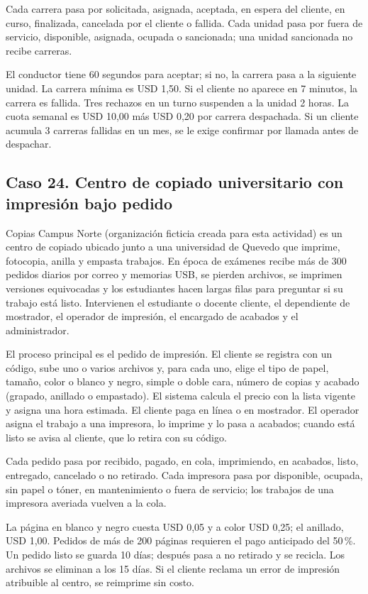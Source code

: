 \documentclass[11pt]{article}
\newcommand{\subseccion}[1]{\subsection{\textcolor{midblue}{#1}}}
\begin{document}
Cada carrera pasa por solicitada, asignada, aceptada, en espera del cliente, en curso, finalizada, cancelada por el cliente o fallida. Cada unidad pasa por fuera de servicio, disponible, asignada, ocupada o sancionada; una unidad sancionada no recibe carreras.

El conductor tiene 60 segundos para aceptar; si no, la carrera pasa a la siguiente unidad. La carrera mínima es USD 1,50. Si el cliente no aparece en 7 minutos, la carrera es fallida. Tres rechazos en un turno suspenden a la unidad 2 horas. La cuota semanal es USD 10,00 más USD 0,20 por carrera despachada. Si un cliente acumula 3 carreras fallidas en un mes, se le exige confirmar por llamada antes de despachar.

\subseccion{Caso 24. Centro de copiado universitario con impresión bajo pedido}
Copias Campus Norte (organización ficticia creada para esta actividad) es un centro de copiado ubicado junto a una universidad de Quevedo que imprime, fotocopia, anilla y empasta trabajos. En época de exámenes recibe más de 300 pedidos diarios por correo y memorias USB, se pierden archivos, se imprimen versiones equivocadas y los estudiantes hacen largas filas para preguntar si su trabajo está listo. Intervienen el estudiante o docente cliente, el dependiente de mostrador, el operador de impresión, el encargado de acabados y el administrador.

El proceso principal es el pedido de impresión. El cliente se registra con un código, sube uno o varios archivos y, para cada uno, elige el tipo de papel, tamaño, color o blanco y negro, simple o doble cara, número de copias y acabado (grapado, anillado o empastado). El sistema calcula el precio con la lista vigente y asigna una hora estimada. El cliente paga en línea o en mostrador. El operador asigna el trabajo a una impresora, lo imprime y lo pasa a acabados; cuando está listo se avisa al cliente, que lo retira con su código.

Cada pedido pasa por recibido, pagado, en cola, imprimiendo, en acabados, listo, entregado, cancelado o no retirado. Cada impresora pasa por disponible, ocupada, sin papel o tóner, en mantenimiento o fuera de servicio; los trabajos de una impresora averiada vuelven a la cola.

La página en blanco y negro cuesta USD 0,05 y a color USD 0,25; el anillado, USD 1,00. Pedidos de más de 200 páginas requieren el pago anticipado del 50\,\%. Un pedido listo se guarda 10 días; después pasa a no retirado y se recicla. Los archivos se eliminan a los 15 días. Si el cliente reclama un error de impresión atribuible al centro, se reimprime sin costo.
\end{document}
